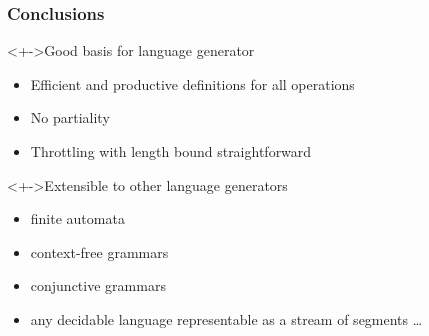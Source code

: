 \documentclass[pdftex]{beamer}
\begin{document}
\begin{frame}
  \frametitle{Conclusions}
  \begin{block}<+->{Good basis for language generator}
    \begin{itemize}
    \item Efficient and productive definitions for all operations
    \item No partiality
    \item Throttling with length bound straightforward
    \end{itemize}
  \end{block}
  \begin{block}<+->{Extensible to other language generators}
    \begin{itemize}
    \item finite automata
    \item context-free grammars
    \item conjunctive grammars
    \item any decidable language representable as a stream of segments \dots
    \end{itemize}
  \end{block}
\end{frame}
\end{document}
